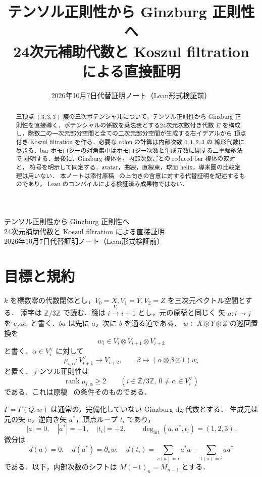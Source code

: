 \documentclass[a4paper,11pt]{ltjsarticle}
\title{テンソル正則性から Ginzburg 正則性へ\\[3pt]
\large 24次元補助代数と Koszul filtration による直接証明}
\author{}
\date{2026年10月7日\quad 代替証明ノート（Lean形式検証前）}
\theoremstyle{definition}
\DeclareMathOperator{\rank}{rank}
\newcommand{\Zthree}{\mathbb Z/3\mathbb Z}
\newcommand{\dual}{^{\vee}}
\begin{document}
\begin{center}
{\LARGE テンソル正則性から Ginzburg 正則性へ}\\[7pt]
{\large 24次元補助代数と Koszul filtration による直接証明}\\[9pt]
2026年10月7日\quad 代替証明ノート（Lean形式検証前）
\end{center}\vspace{3mm}
\begin{abstract}
三頂点 $(3,3,3)$ 箙の三次ポテンシャルについて，テンソル正則性から
Ginzburg 正則性を直接導く．ポテンシャルの係数を乗法表とする24次元次数付き代数
$E$ を構成し，階数二の一次元部分空間と全ての二次元部分空間が生成する右イデアルから
頂点付き Koszul filtration を作る．必要な colon の計算は内部次数 $0,1,2,3$ の
線形代数に尽きる．bar ホモロジーの対角集中はホモロジー次数と生成元数に関する二重帰納法で
証明する．最後に，Ginzburg 複体を，内部次数ごとの reduced bar 複体の双対と，
符号を明示して同定する．avatar，曲線，直線束，球面 helix，導来圏の比較定理は用いない．
本ノートは添付原稿~\cite{input} の上向きの含意に対する代替証明を記述するものであり，
Lean のコンパイルによる検証済み成果物ではない．
\end{abstract}

\section{目標と規約}
$k$ を標数零の代数閉体とし，$V_0=X,V_1=Y,V_2=Z$ を三次元ベクトル空間とする．
添字は $\Zthree$ で読む．箙は $i\xrightarrow{V_i}i+1$ とし，元の原稿と同じく
矢 $a:i\to j$ を $e_jae_i$ と書く．$ba$ は先に $a$，次に $b$ を通る道である．
$w\in X\otimes Y\otimes Z$ の巡回置換を
\[
 w_i\in V_i\otimes V_{i+1}\otimes V_{i+2}
\]
と書く．$\alpha\in V_i\dual$ に対して
\begin{equation}\label{eq:mu}
 \mu_{i,\alpha}:V_{i+1}\dual\longrightarrow V_{i+2},\qquad
 \beta\longmapsto(\alpha\otimes\beta\otimes1)w_i
\end{equation}
と置く．テンソル正則性は
\begin{equation}\label{eq:reg}
 \rank\mu_{i,\alpha}\geq2\qquad(i\in\Zthree,\ 0\ne\alpha\in V_i\dual)
\end{equation}
である．これは原稿~\cite[定義1.1]{input} の条件そのものである．

$\Gamma=\Gamma(Q,w)$ は通常の，完備化していない Ginzburg dg 代数とする．
生成元は元の矢 $a$，逆向き矢 $a^*$，頂点ループ $t_i$ であり，
\[
 |a|=0,\quad |a^*|=-1,\quad |t_i|=-2,\qquad
 \deg_{\mathrm{int}}(a,a^*,t_i)=(1,2,3).
\]
微分は
\begin{equation}\label{eq:gin}
 d(a)=0,\quad d(a^*)=\partial_aw,\quad
 d(t_i)=\sum_{s(a)=i}a^*a-\sum_{t(a)=i}aa^*
\end{equation}
である．以下，内部次数のシフトは $M(-1)_n=M_{n-1}$ とする．
\end{document}
